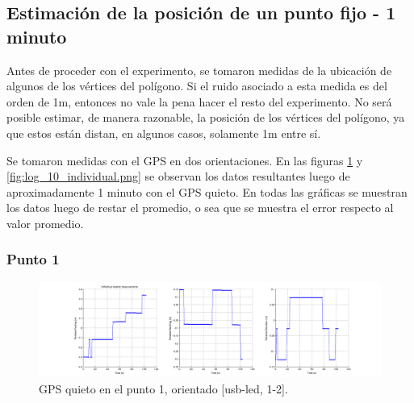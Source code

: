 \documentclass[spanish,12pt,a4paper,titlepage]{report}
\begin{document}
%

\newpage
\subsection{Estimación de la posición de un punto fijo - 1 minuto}
\label{sec:estimacion-de-la-posicion-de-un-punto-fijo}

Antes de proceder con el experimento, se tomaron medidas de la ubicación de algunos de los vértices del polígono. Si el ruido asociado a esta medida es del orden de 1m, entonces no vale la pena hacer el resto del experimento. No será posible estimar, de manera razonable, la posición de los vértices del polígono, ya que estos están distan, en algunos casos, solamente 1m entre sí.

Se tomaron medidas con el GPS en dos orientaciones. En las figuras \ref{fig:log_09_individual.png} y \ref{fig:log_10_individual.png} se observan los datos resultantes luego de aproximadamente 1 minuto con el GPS quieto. En todas las gráficas se muestran los datos luego de restar el promedio, o sea que se muestra el error respecto al valor promedio.

\subsubsection*{Punto 1}
\label{sec:punto-1}

\begin{figure}[h!]
  \hspace{-70pt}
  \includegraphics[width=1.3\textwidth]{./img/log_09_individual.png}
  \caption{GPS quieto en el punto 1, orientado [usb-led, 1-2].}
  \label{fig:log_09_individual.png}
\end{figure}
\end{document}

